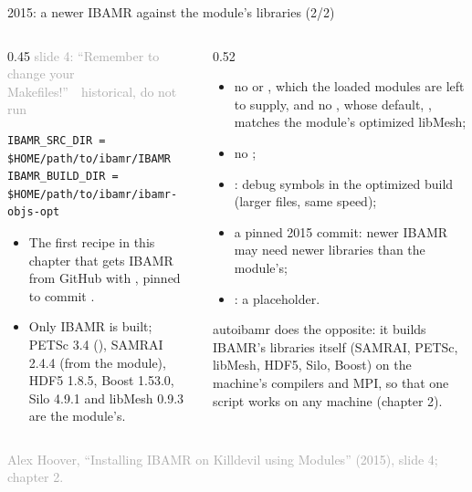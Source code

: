 \documentclass[aspectratio=169,11pt]{beamer}
\newcommand{\sourcecredit}[1]{\vfill\begin{flushright}\tiny\textcolor{DarkGray}{#1}\end{flushright}}
\newcommand{\hist}[1]{{\tiny\sffamily\textcolor{DarkGray}{#1\ \textbullet\ historical, do not run}}\par\nointerlineskip\vspace{0.3mm}}
\begin{document}
\begin{frame}[fragile]{2015: a newer IBAMR against the module's libraries (2/2)}
\label{fr:hoover2}
\begin{columns}[T,onlytextwidth]
\begin{column}{0.45\textwidth}
\hist{slide 4: ``Remember to change your Makefiles!''}
\begin{lstlisting}[style=hist]
IBAMR_SRC_DIR = $HOME/path/to/ibamr/IBAMR
IBAMR_BUILD_DIR = $HOME/path/to/ibamr/ibamr-objs-opt
\end{lstlisting}
\footnotesize
\begin{itemize}\setlength{\itemsep}{2pt}
  \item The first recipe in this chapter that gets IBAMR from GitHub with , pinned to commit .
  \item Only IBAMR is built; PETSc 3.4 (), SAMRAI 2.4.4 (from the  module), HDF5 1.8.5, Boost 1.53.0, Silo 4.9.1 and libMesh 0.9.3 are the module's.
\end{itemize}
\end{column}
\begin{column}{0.52\textwidth}
\footnotesize {}
\begin{itemize}\setlength{\itemsep}{2pt}
  \item no  or , which the loaded modules are left to supply, and no , whose default, , matches the module's optimized libMesh;
  \item no ;
  \item {}: debug symbols in the optimized build (larger files, same speed);
  \item a pinned 2015 commit: newer IBAMR may need newer libraries than the module's;
  \item {}: a placeholder.
\end{itemize}
\vspace{1mm}
autoibamr does the opposite: it builds IBAMR's libraries itself (SAMRAI, PETSc, libMesh, HDF5, Silo, Boost) on the machine's compilers and MPI, so that one script works on any machine (chapter 2).
\end{column}
\end{columns}
\sourcecredit{Alex Hoover, ``Installing IBAMR on Killdevil using Modules'' (2015), slide 4; chapter 2.}
\end{frame}
\end{document}
